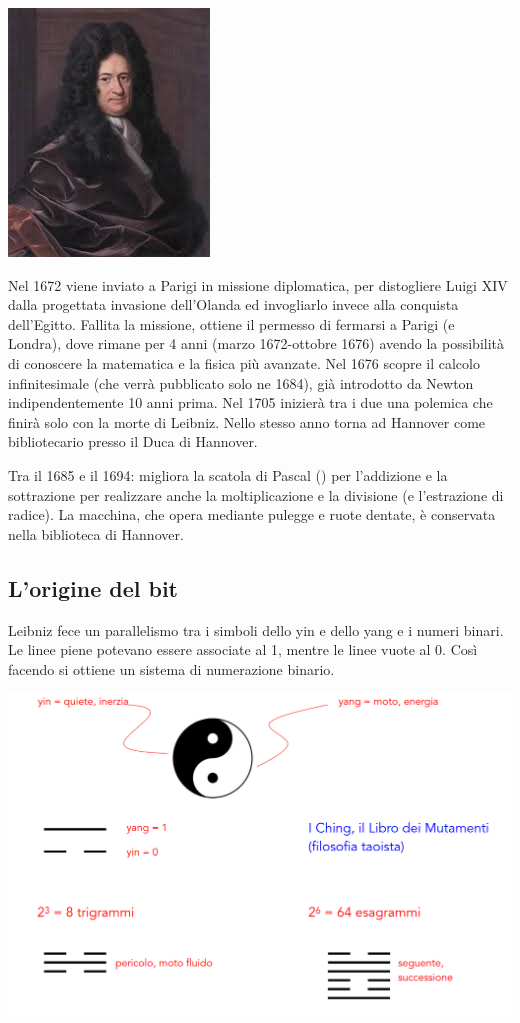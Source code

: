 \begin{center}
\includegraphics[scale = 0.7]{images/Leibniz.jpg}
\end{center}

Nel 1672 viene inviato a Parigi in missione diplomatica, per distogliere Luigi XIV dalla
progettata invasione dell’Olanda ed invogliarlo invece alla conquista dell’Egitto.
Fallita la missione, ottiene il permesso di fermarsi a Parigi (e Londra), dove rimane per 4
anni (marzo 1672-ottobre 1676) avendo la possibilità di conoscere la matematica e la
fisica più avanzate. Nel 1676 scopre il calcolo infinitesimale (che verrà pubblicato solo ne 1684), già
introdotto da Newton indipendentemente 10 anni prima. Nel 1705 inizierà tra i due una
polemica che finirà solo con la morte di Leibniz.
Nello stesso anno torna ad Hannover come bibliotecario presso il Duca di Hannover.

Tra il 1685 e il 1694: migliora la scatola di Pascal () per l’addizione e la sottrazione per realizzare
anche la moltiplicazione e la divisione (e l’estrazione di radice). La macchina, che opera
mediante pulegge e ruote dentate, è conservata nella biblioteca di Hannover.

\subsection{L'origine del bit}

Leibniz fece un parallelismo tra i simboli dello yin e dello yang e i numeri binari.
Le linee piene potevano essere associate al 1, mentre le linee vuote al 0.
Così facendo si ottiene un sistema di numerazione binario.

\begin{center}
    \includegraphics[scale = 0.3]{images/Origine bit.png}
\end{center}

